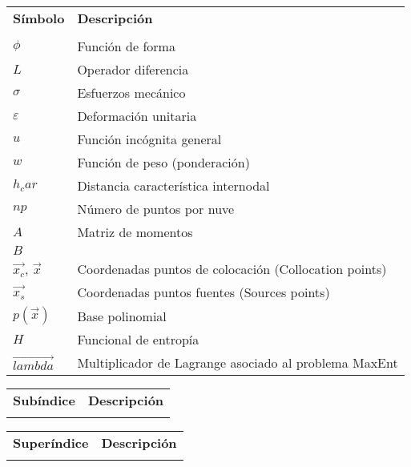 
\begin{tabular}{ll}
	\textbf{Símbolo} & \textbf{Descripción} \\
	& \\
	$\phi$ & Función de forma \\
	$L$ & Operador diferencia \\
	$\sigma$ & Esfuerzos mecánico \\
	$\varepsilon$ & Deformación unitaria \\
	$u$ & Función incógnita general \\
	$w$ & Función de peso (ponderación) \\
	$h_car$ & Distancia característica internodal \\
	$np$ & Número de puntos por nuve \\
	$A$ & Matriz de momentos \\
	$B$ & \\
	$\vec{x_c}$, $\vec{x}$ & Coordenadas puntos de colocación (Collocation points) \\
	$\vec{x_s}$ & Coordenadas puntos fuentes (Sources points) \\
	$p(\vec{x})$ & Base polinomial \\
	$H$ & Funcional de entropía \\
	$\vec{lambda}$ & Multiplicador de Lagrange asociado al problema MaxEnt  \\
\end{tabular}

\newpage

\begin{tabular}{ll}
	\textbf{Subíndice} & \textbf{Descripción}\\
	&	
\end{tabular}

\bigskip
\begin{tabular}{ll}
	\textbf{Superíndice} & \textbf{Descripción}\\
	 & 
\end{tabular}